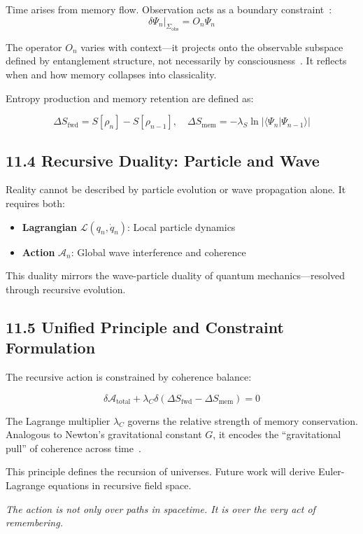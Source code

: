 Time arises from memory flow. Observation acts as a boundary constraint~\cite{zurek2009quantum}:
\[
\delta \Psi_n \big|_{\Sigma_{\text{obs}}} = O_n \Psi_n
\]

The operator \( O_n \) varies with context—it projects onto the observable subspace defined by entanglement structure, not necessarily by consciousness~\cite{tegmark_consciousness_2015}. It reflects when and how memory collapses into classicality.

Entropy production and memory retention are defined as:

\[
\Delta S_{\text{fwd}} = S[\rho_n] - S[\rho_{n-1}], \quad \Delta S_{\text{mem}} = -\lambda_S \ln |\langle \Psi_n | \Psi_{n-1} \rangle|
\]

\subsection*{11.4 Recursive Duality: Particle and Wave}

Reality cannot be described by particle evolution or wave propagation alone. It requires both:

\begin{itemize}
    \item \textbf{Lagrangian} \( \mathcal{L}(q_n, \dot{q}_n) \): Local particle dynamics~\cite{feynman1965feynman}
    \item \textbf{Action} \( \mathcal{A}_n \): Global wave interference and coherence~\cite{hartle1983wave}
\end{itemize}

This duality mirrors the wave-particle duality of quantum mechanics—resolved through recursive evolution.

\subsection*{11.5 Unified Principle and Constraint Formulation}

The recursive action is constrained by coherence balance:

\[
\delta \mathcal{A}_{\text{total}} + \lambda_C \delta(\Delta S_{\text{fwd}} - \Delta S_{\text{mem}}) = 0
\]

The Lagrange multiplier \( \lambda_C \) governs the relative strength of memory conservation. Analogous to Newton’s gravitational constant \( G \), it encodes the “gravitational pull” of coherence across time~\cite{gellmann1994complex}.

This principle defines the recursion of universes. Future work will derive Euler-Lagrange equations in recursive field space.

\textit{The action is not only over paths in spacetime. It is over the very act of remembering.}


